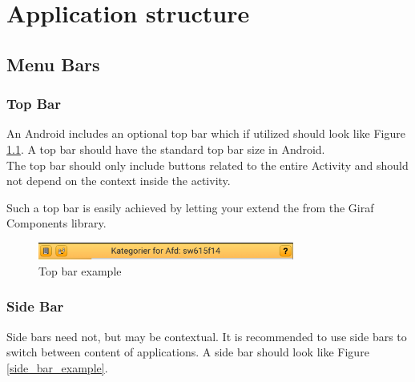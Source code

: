
\chapter{Application structure}

\section{Menu Bars}

\subsection{Top Bar}
An Android  includes an optional top bar which if utilized should look like Figure \ref{fig:top_bar_example}. A top bar should have the standard top bar size in Android.\\
The top bar should only include buttons related to the entire Activity and should not depend on the context inside the activity.

\begin{note}
Such a top bar is easily achieved by letting your  extend the  from the Giraf Components library.
\end{note}

\begin{figure}[!htbp]
        \centering
        \includegraphics[width=0.75\textwidth]{pictures/application_structure/topbar}
        \caption{Top bar example}
        \label{fig:top_bar_example}
\end{figure}

\subsection{Side Bar}

Side bars need not, but may be contextual. It is recommended to use side bars to switch between content of applications. A side bar should look like Figure \ref{side_bar_example}.

